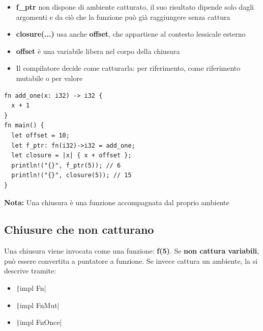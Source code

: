 \begin{flushleft}
  \begin{minipage}{0.45\linewidth}
    \raggedright
    \begin{itemize}
      \item \textbf{f\_ptr} non dispone di ambiente catturato, il suo
            risultato dipende solo dagli argomenti e da ciò che la funzione può già
            raggiungere senza cattura
      \item \textbf{closure(...)} usa anche \textbf{offset}, che appartiene al contesto lessicale esterno
      \item \textbf{offset} è una variabile libera nel corpo della chiusura
      \item Il compilatore decide come catturarla: per riferimento, come riferimento mutabile o per valore
    \end{itemize}

  \end{minipage}%
  \hfill
  \begin{minipage}{0.45\linewidth}
    \begin{verbatim}
fn add_one(x: i32) -> i32 {
  x + 1
}
fn main() {
  let offset = 10;
  let f_ptr: fn(i32)->i32 = add_one;
  let closure = |x| { x + offset };
  println!("{}", f_ptr(5)); // 6
  println!("{}", closure(5)); // 15
}
\end{verbatim}
  \end{minipage}
\end{flushleft}

\begin{tcolorbox}
  \textbf{Nota:} Una chiusura è una funzione accompagnata dal proprio ambiente
\end{tcolorbox}


\subsection{Chiusure che non catturano}
Una chiusura viene invocata come una funzione: \textbf{f(5)}.
Se \textbf{non cattura variabili}, può essere convertita a puntatore a funzione.
Se invece cattura un ambiente, la si descrive tramite:

\begin{itemize}
  \item \texttt|impl Fn|
  \item \texttt|impl FnMut|
  \item \texttt|impl FnOnce|
\end{itemize}

